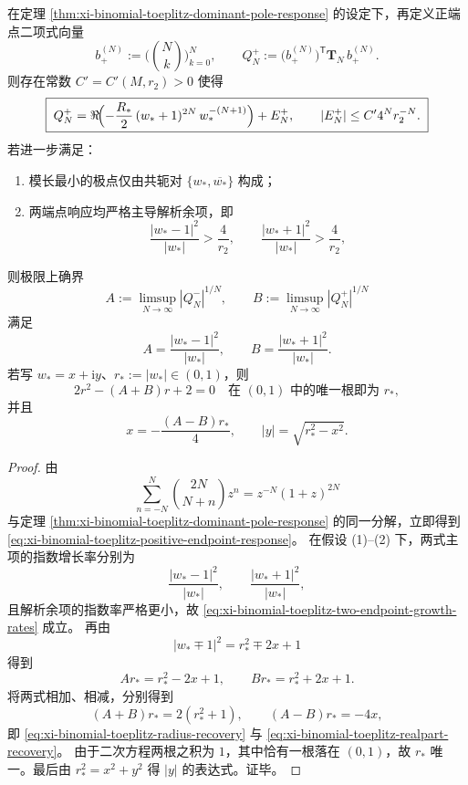 \begin{theorem}[双端点增长率的主导极点反演]\label{thm:xi-binomial-toeplitz-two-endpoint-pole-inversion}
在定理 \ref{thm:xi-binomial-toeplitz-dominant-pole-response} 的设定下，再定义正端点二项式向量
\[
b_+^{(N)}:=\bigl(\binom Nk\bigr)_{k=0}^{N},
\qquad
Q_N^+:=\bigl(b_+^{(N)}\bigr)^{\mathsf T}\mathbf T_N\,b_+^{(N)}.
\]
则存在常数 \(C'=C'(M,r_2)>0\) 使得
\begin{equation}\label{eq:xi-binomial-toeplitz-positive-endpoint-response}
\boxed{\;
Q_N^+
=
\Re\!\Bigl(
-\frac{R_\ast}{2}\,
(w_\ast+1)^{2N}\,
w_\ast^{-(N+1)}
\Bigr)
+E_N^+,
\qquad
|E_N^+|\le C'4^N r_2^{-N}.
\;}
\end{equation}
若进一步满足：
\begin{enumerate}
  \item 模长最小的极点仅由共轭对 \(\{w_\ast,\overline{w_\ast}\}\) 构成；
  \item 两端点响应均严格主导解析余项，即
  \[
  \frac{|w_\ast-1|^2}{|w_\ast|}>\frac{4}{r_2},
  \qquad
  \frac{|w_\ast+1|^2}{|w_\ast|}>\frac{4}{r_2},
  \]
\end{enumerate}
则极限上确界
\[
A:=\limsup_{N\to\infty}|Q_N^-|^{1/N},
\qquad
B:=\limsup_{N\to\infty}|Q_N^+|^{1/N}
\]
满足
\begin{equation}\label{eq:xi-binomial-toeplitz-two-endpoint-growth-rates}
\boxed{\;
A=\frac{|w_\ast-1|^2}{|w_\ast|},
\qquad
B=\frac{|w_\ast+1|^2}{|w_\ast|}.
\;}
\end{equation}
若写 \(w_\ast=x+\mathrm{i}y\)、\(r_\ast:=|w_\ast|\in(0,1)\)，则
\begin{equation}\label{eq:xi-binomial-toeplitz-radius-recovery}
\boxed{\;
2r^2-(A+B)r+2=0
\quad\text{在 }(0,1)\text{ 中的唯一根即为 }r_\ast,
\;}
\end{equation}
并且
\begin{equation}\label{eq:xi-binomial-toeplitz-realpart-recovery}
\boxed{\;
x=-\frac{(A-B)r_\ast}{4},
\qquad
|y|=\sqrt{r_\ast^2-x^2}.
\;}
\end{equation}
\end{theorem}

\begin{proof}
由
\[
\sum_{n=-N}^{N}\binom{2N}{N+n}z^n
=
z^{-N}(1+z)^{2N}
\]
与定理 \ref{thm:xi-binomial-toeplitz-dominant-pole-response} 的同一分解，立即得到
\eqref{eq:xi-binomial-toeplitz-positive-endpoint-response}。
在假设 (1)--(2) 下，两式主项的指数增长率分别为
\[
\frac{|w_\ast-1|^2}{|w_\ast|},
\qquad
\frac{|w_\ast+1|^2}{|w_\ast|},
\]
且解析余项的指数率严格更小，故 \eqref{eq:xi-binomial-toeplitz-two-endpoint-growth-rates} 成立。
再由
\[
|w_\ast\mp 1|^2=r_\ast^2\mp 2x+1
\]
得到
\[
Ar_\ast=r_\ast^2-2x+1,
\qquad
Br_\ast=r_\ast^2+2x+1.
\]
将两式相加、相减，分别得到
\[
(A+B)r_\ast=2(r_\ast^2+1),
\qquad
(A-B)r_\ast=-4x,
\]
即 \eqref{eq:xi-binomial-toeplitz-radius-recovery} 与 \eqref{eq:xi-binomial-toeplitz-realpart-recovery}。
由于二次方程两根之积为 \(1\)，其中恰有一根落在 \((0,1)\)，故 \(r_\ast\) 唯一。最后由 \(r_\ast^2=x^2+y^2\) 得 \(|y|\) 的表达式。证毕。
\end{proof}

